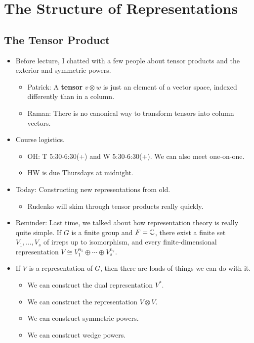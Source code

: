 \documentclass[../notes.tex]{subfiles}
\begin{document}
\chapter{The Structure of Representations}
\section{The Tensor Product}
\begin{itemize}
    \item {}Before lecture, I chatted with a few people about tensor products and the exterior and symmetric powers.
    \begin{itemize}
        \item Patrick: A \textbf{tensor} $v\otimes w$ is just an element of a vector space, indexed differently than in a column.
        \item Raman: There is no canonical way to transform tensors into column vectors.
    \end{itemize}
    \item Course logistics.
    \begin{itemize}
        \item OH: T 5:30-6:30(+) and W 5:30-6:30(+). We can also meet one-on-one.
        \item HW is due Thursdays at midnight.
    \end{itemize}
    \item Today: Constructing new representations from old.
    \begin{itemize}
        \item Rudenko will skim through tensor products really quickly.
    \end{itemize}
    \item Reminder: Last time, we talked about how representation theory is really quite simple. If $G$ is a finite group and $F=\mathbb{C}$, there exist a finite set $V_1,\dots,V_s$ of irreps up to isomorphism, and every finite-dimensional representation $V\cong V_1^{n_1}\oplus\cdots\oplus V_s^{n_s}$.
    \item If $V$ is a representation of $G$, then there are loads of things we can do with it.
    \begin{itemize}
        \item We can construct the dual representation $V^*$.
        \item We can construct the representation $V\otimes V$.
        \item We can construct symmetric powers.
        \item We can construct wedge powers.

\end{itemize}
\end{itemize}
\end{document}
